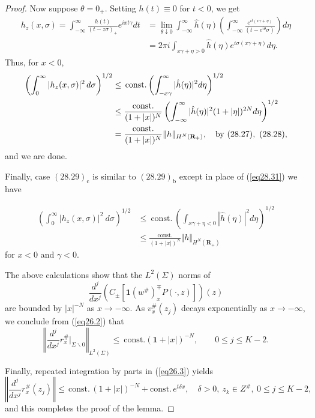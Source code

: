 \documentclass{surv-l}
\theoremstyle{plain}
\theoremstyle{definition}
\numberwithin{equation}{chapter}
\begin{document}
\begin{proof}
Now suppose $\theta=0_{+}$. Setting $h(t)\equiv 0$ for $t<0$, we get
\begin{align*}
h_{z}(x, \sigma)=\int_{-\infty}^{\infty}\frac{h(t)}{(t-z\sigma)_{+}}e^{ixt\gamma}dt&=\lim_{\theta\downarrow 0}\int_{-\infty}^{\infty}\hat{h}(\eta)\left(\int_{-\infty}^{\infty}\frac{e^{it(x\gamma+\eta)}}{(t-e^{i\theta}\sigma)}\right)d\eta\\
&=2\pi i\int_{x\gamma+\eta>0}\hat{h}(\eta)e^{i\sigma(x\gamma+\eta)}d\eta.
\end{align*}
Thus, for $x<0$,
\begin{align}\label{eq28.31}
\left(\int_{0}^{\infty}|h_{z}(x,\sigma)|^{2}\,d\sigma\right)^{1/2}&\leq\,\mathrm{const.}\left( \int_{-x\gamma}^{\infty}|\hat{h}(\eta)|^{2}d\eta\right)^{1/2}\\\nonumber
&\leq\frac{\mathrm{const.}}{(1+|x|)^{N}}\left(\int_{-\infty}^{\infty}|\hat{h}(\eta)|^{2}(1+|\eta|)^{2N}d\eta\right)^{1/2}\\ \notag
&=\frac{\mathrm{const.}}{(1+|x|)^{N}}\Vert h\Vert_{H^{N}(\mathbf{R}_{+})},\quad \mathrm{by}\ (28.27),\ (28.28),\notag
\end{align}
and we are done.

Finally, case $(28.29)_{\mathrm{c}}$ is similar to $(28.29)_{\mathrm{b}}$ except in place of (\ref{eq28.31}) we have

\begin{align*}
\tag*{(28.31)$'$}\left( \int_{0}^{\infty}|h_{z}(x,\sigma)|^{2}\ d\sigma\right)^{1/2}&\leq\ \mathrm{const}.\ \left( \int_{x\gamma+\eta<0}|\hat{h}(\eta)|^{2}d\eta\right)^{1/2}\\
&\leq\frac{\mathrm{const.}}{(1+|x|)^{N}}\Vert h\Vert_{H^{N}(\mathbf{R}_{+})}\nonumber
\end{align*}
for $x<0$ and $\gamma<0$.

The above calculations show that the $L^{2}(\Sigma)$ norms of
\begin{equation*}
\frac{d^{j}}{dx^{j}}(C_{\pm}[\mathbf{1}(w^{\#})_{x}^{\mp}P(\cdot, z)])(z)
\end{equation*}
are bounded by $|x|^{-N}$ as $ x\rightarrow-\infty$. As $v_{x}^{\#}(z_{j})$ decays exponentially as $ x\rightarrow-\infty$, we conclude from (\ref{eq26.2}) that
\begin{equation*}
\left\Vert\frac{d^{j}}{dx^{j}}r_{x}^{\#}\Big|_{\Sigma\backslash 0}\right\Vert_{L^{2}(\Sigma)}\leq\ \mathrm{const.} (\mathbf{1}+|x|)^{-N},\qquad 0\leq j\leq K-2.
\end{equation*}

Finally, repeated integration by parts in (\ref{eq26.3}) yields
\begin{equation*}
\left\Vert\frac{d^{j}}{dx^{j}}r_{x}^{\#}(z_{j})\right\Vert\leq\, \mathrm{const.}\, (1+|x|)^{-N}+\mathrm{const.}\, e^{t\delta x},\quad \delta>0,\ z_{k}\in Z^{\#},\ 0\leq j\leq K-2,
\end{equation*}
and this completes the proof  of the lemma.
\end{proof}
\end{document}
